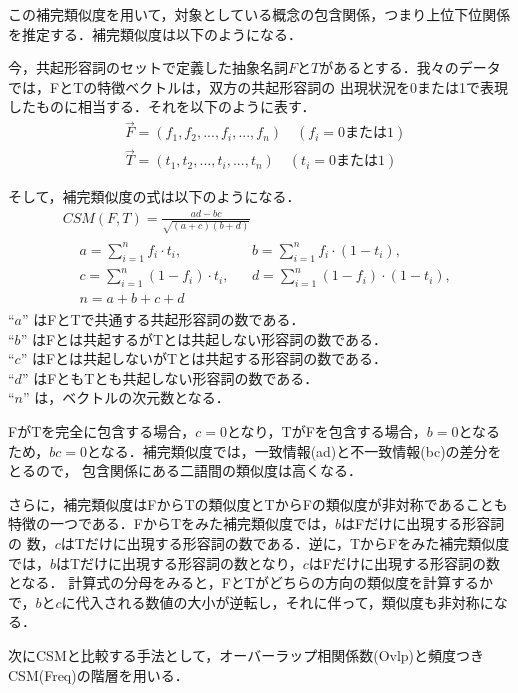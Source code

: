 \documentclass[japanese]{jnlp_1.4}
\begin{document}
この補完類似度を用いて，対象としている概念の包含関係，つまり上位下位関係を推定する．補完類似度は以下のようになる．

今，共起形容詞のセットで定義した抽象名詞$F$と$T$があるとする．我々のデータでは，FとTの特徴ベクトルは，双方の共起形容詞の
出現状況を0または1で表現したものに相当する．それを以下のように表す．
\begin{align*}
 & \overrightarrow{F}=(f_{1}, f_{2},..., f_{i},... ,f_{n}) \quad (f_{i}=0 または 1) \\
 & \overrightarrow{T}=(t_{1}, t_{2},..., t_{i},..., t_{n}) \quad (t_{i}=0 または 1)
\end{align*}

そして，補完類似度の式は以下のようになる．
\begin{gather}
 CSM(F, T) = \frac{ad-bc}{\sqrt{(a+c)(b+d)}} \\
\begin{aligned}
 & a = \sum_{i=1}^n f_i \cdot t_i, && b = \sum_{i=1}^n f_i \cdot (1 - t_i), \\
 & c = \sum_{i=1}^n (1 - f_i) \cdot t_i, && d = \sum_{i=1}^n (1 - f_i) \cdot (1 - t_i), \\
 & n = a + b + c + d &&
\end{aligned}
\nonumber
\end{gather}
``$a$'' はFとTで共通する共起形容詞の数である．\\
``$b$'' はFとは共起するがTとは共起しない形容詞の数である．\\
``$c$'' はFとは共起しないがTとは共起する形容詞の数である．\\
``$d$'' はFともTとも共起しない形容詞の数である．\\
``$n$'' は，ベクトルの次元数となる．
\vspace{\baselineskip}

FがTを完全に包含する場合，$c=0$となり，TがFを包含する場合，$b=0$となるため，$bc=0$となる．補完類似度では，一致情報(ad)と不一致情報(bc)の差分をとるので，
包含関係にある二語間の類似度は高くなる．

さらに，補完類似度はFからTの類似度とTからFの類似度が非対称であることも特徴の一つである．FからTをみた補完類似度では，$b$はFだけに出現する形容詞の
数，$c$はTだけに出現する形容詞の数である．逆に，TからFをみた補完類似度では，$b$はTだけに出現する形容詞の数となり，$c$はFだけに出現する形容詞の数となる．
計算式の分母をみると，FとTがどちらの方向の類似度を計算するかで，$b$と$c$に代入される数値の大小が逆転し，それに伴って，類似度も非対称になる．

次にCSMと比較する手法として，オーバーラップ相関係数(Ovlp)と頻度つきCSM(Freq)の階層を用いる．
\end{document}
